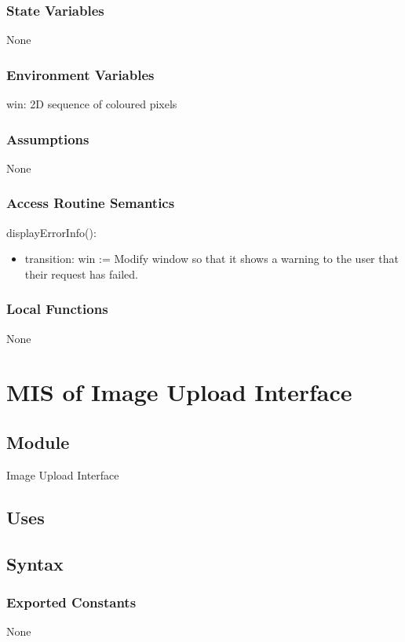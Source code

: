 \documentclass[12pt, titlepage]{article}
\begin{document}
\subsubsection{State Variables}
None
\subsubsection{Environment Variables}
win: 2D sequence of coloured pixels

\subsubsection{Assumptions}
None

\subsubsection{Access Routine Semantics}

\noindent displayErrorInfo():
\begin{itemize}
\item transition: win := Modify window so that it shows a warning to the user that their request has failed.
\end{itemize}

\subsubsection{Local Functions}
None

\section{MIS of Image Upload Interface} \label{iui}

\subsection{Module}

Image Upload Interface

\subsection{Uses}


\subsection{Syntax}

\subsubsection{Exported Constants}
None
\end{document}
